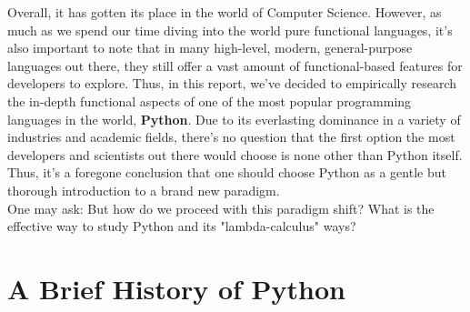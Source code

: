 \documentclass[twoside,final]{hcmut-report}
\begin{document}
Overall, it has gotten  its place in the world of Computer Science. However, as much as we spend our time diving into the world pure functional languages, it's also important to note that in many high-level, modern, general-purpose languages out there, they still offer a vast amount of functional-based features for developers to explore. Thus, in this report, we've decided to empirically research the in-depth functional aspects of one of the most popular programming languages in the world, \textbf{Python}. Due to its everlasting dominance in a variety of industries and academic fields, there's no question that the first option the most developers and scientists out there would choose is none other than Python itself. Thus, it's a foregone conclusion that one should choose Python as a gentle but thorough introduction to a brand new paradigm.
\\
\hspace*{4mm} One may ask: But how do we proceed with this paradigm shift? What is the effective way to study Python and its "lambda-calculus" ways? 



\section{A Brief History of Python}
\end{document}
